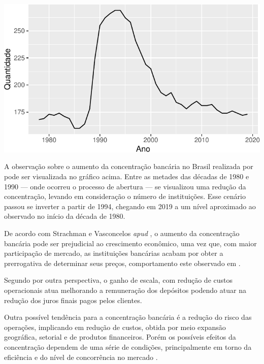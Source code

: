 \documentclass[12pt,openright,oneside,a4paper,chapter=TITLE,section=TITLE,subsection=Title,english,french,spanish,portugues,sumario=tradicional]{04-class-files/abntex2}
\begin{document}

\begin{center}\includegraphics{12-exportedfigures/concetration-1} \end{center}

\label{fig:concentracao}

A observação sobre o aumento da concentração bancária no Brasil realizada por \textcite{camargo:2009} pode ser visualizada no gráfico acima. Entre as metades das décadas de 1980 e 1990 --- onde ocorreu o processo de abertura --- se visualizou uma redução da concentração, levando em consideração o número de instituições. Esse cenário passou se inverter a partir de 1994, chegando em 2019 a um nível aproximado ao observado no início da década de 1980.

De acordo com Strachman e Vasconcelos \emph{apud} \textcite{camargo:2009}, o aumento da concentração bancária pode ser prejudicial ao crescimento econômico, uma vez que, com maior participação de mercado, as instituições bancárias acabam por obter a prerrogativa de determinar seus preços, comportamento este observado em \textcite{klein:1971}.

Segundo \textcite{camargo:2009} por outra perspectiva, o ganho de escala, com redução de custos operacionais atua melhorando a remuneração dos depósitos podendo atuar na redução dos juros finais pagos pelos clientes.

Outra possível tendência para a concentração bancária é a redução do risco das operações, implicando em redução de custos, obtida por meio expansão geográfica, setorial e de produtos financeiros. Porém os possíveis efeitos da concentração dependem de uma série de condições, principalmente em torno da eficiência e do nível de concorrência no mercado \cite{camargo:2009}.
\end{document}
